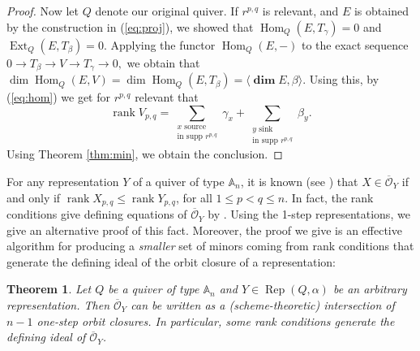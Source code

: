 \documentclass[twoside]{article}
\newcommand{\ds}{\displaystyle\sum}
\newcommand{\orb}{\mathcal{O}}
\newcommand{\ove}{\overline}
\DeclareMathOperator{\Dim}{\mathbf{dim}}
\newcommand{\Hom}{\operatorname{Hom}}
\newcommand{\Ext}{\operatorname{Ext}}
\newcommand{\Rep}{\operatorname{Rep}}
\newcommand{\rank}{\operatorname{rank}}
\newcommand{\A}{\mathbb{A}}
\newtheorem{theorem}{Theorem}[section]
\theoremstyle{definition}
\begin{document}
\begin{proof}
Now let $Q$ denote our original quiver. If $r^{p,q}$ is relevant, and $E$ is obtained by the construction in (\ref{eq:proj}), we showed that $\Hom_Q(E,T_\gamma)=0$ and $\Ext_Q(E,T_\beta)=0$. Applying the functor $\Hom_Q(E,-)$ to the exact sequence $0\to T_\beta \to V \to T_\gamma\to 0,$ we obtain that $\dim\Hom_Q(E,V)=\dim\Hom_Q(E,T_\beta)=\langle \Dim E,\beta\rangle$. Using this, by (\ref{eq:hom}) we get for $r^{p,q}$ relevant that
\[\rank V_{p,q} = \ds_{\substack{x \text{ source}\\ \text{in supp } r^{p,q}}} \gamma_x +\ds_{\substack{y \text{ sink}\\ \text{in supp } r^{p,q}}} \beta_y.\]
Using Theorem \ref{thm:min}, we obtain the conclusion.
\end{proof}

For any representation $Y$ of a quiver of type $\A_n$, it is known (see \cite{abeasis2}) that $X\in \ove{\orb}_Y$ if and only if $\rank X_{p,q}\leq \rank Y_{p,q}$, for all $1\leq p<q \leq n$. In fact, the rank conditions give defining equations of $\ove{\orb}_Y$ by \cite[Theorem 6.4]{scheme}. Using the 1-step representations, we give an alternative proof of this fact. Moreover, the proof we give is an effective algorithm for producing a \textit{smaller} set of minors coming from rank conditions that generate the defining ideal of the orbit closure of a representation:

\begin{theorem}\label{thm:scheme}
Let $Q$ be a quiver of type $\A_n$ and $Y\in \Rep(Q,\alpha)$ be an arbitrary representation. Then $\ove{\orb}_Y$ can be written as a (scheme-theoretic) intersection of $n-1$ one-step orbit closures. In particular, some rank conditions generate the defining ideal of $\ove{\orb}_Y$.
\end{theorem}
\end{document}
